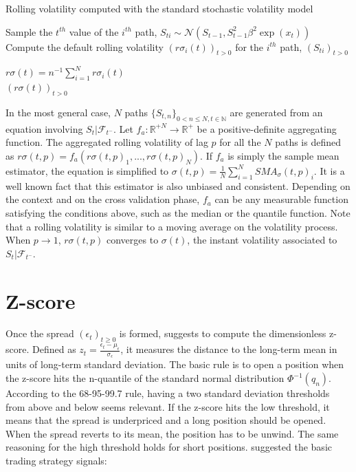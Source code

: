 \documentclass[11pt,a4,twosided,singlespacing,titlepagenumber=on]{scrreprt}
\numberwithin{equation}{chapter} %
\theoremstyle{remark}
\begin{document}
\begin{algorithm}
\caption{Rolling volatility computed with the standard stochastic volatility model}\label{volatility_std_sv}
\begin{algorithmic}[1]

		\State Sample the $t^{th}$ value of the $i^{th}$ path, $S_{ti} \sim \mathcal{N}(S_{t-1}, S_{t-1}^2 \beta^2 \exp(x_t))$
	\State Compute the default rolling volatility $(r\sigma_i(t))_{t>0}$ for the $i^{th}$ path, $(S_{ti})_{t>0}$

	\State $\displaystyle{r\sigma(t) = n^{-1} \sum_{i=1}^N r\sigma_i(t)}$
\\
\Return $(r\sigma(t))_{t>0}$
\EndProcedure
\end{algorithmic}
\end{algorithm}

\noindent
In the most general case, $N$ paths $\{S_{t,n}\}_{0 < n \leq N, t \in \mathbb{N}}$ are generated from an equation involving $S_t | \mathcal{F}_{t^-}$. Let $f_a : \mathbb{R}^{+N} \rightarrow \mathbb{R}^+$ be a positive-definite aggregating function. The aggregated rolling volatility of lag $p$ for all the $N$ paths is defined as $r\sigma(t,p) = f_a(r\sigma(t, p)_1,...,r\sigma(t, p)_N)$.
If $f_a$ is simply the sample mean estimator, the equation is simplified to
$\sigma(t,p) = \frac{1}{N}\sum_{i=1}^N SMA_\sigma(t, p)_i$. It is a well known fact that this estimator is also unbiased and consistent. Depending on the context and on the cross validation phase, $f_a$ can be any measurable function satisfying the conditions above, such as the median or the quantile function.
Note that a rolling volatility is similar to a moving average on the volatility process. When $p \rightarrow 1$, $r\sigma(t,p)$ converges to $\sigma(t)$, the instant volatility associated to $S_t | \mathcal{F}_{t^-}$.

\section{Z-score}
Once the spread $(\epsilon_t)_{t \geq 0}$ is formed, \cite{caldeira2013} suggests to compute the dimensionless z-score. Defined as $z_t = \frac{\epsilon_t-\mu_\epsilon}{\sigma_\epsilon}$, it measures the distance to the long-term mean in units of long-term standard deviation. The basic rule is to open a position when the z-score hits the n-quantile of the standard normal distribution $\Phi^{-1}(q_n)$. According to the 68-95-99.7 rule, having a two standard deviation thresholds from above and below seems relevant. If the z-score hits the low threshold, it means that the spread is underpriced and a long position should be opened. When the spread reverts to its mean, the position has to be unwind. The same reasoning for the high threshold holds for short positions. \cite{caldeira2013} suggested the basic trading strategy signals:
\end{document}
